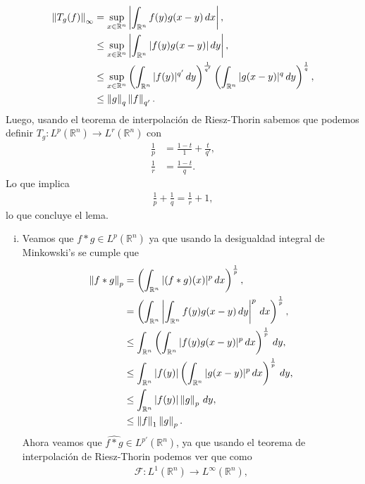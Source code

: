 \begin{homeworkProblem}
  \begin{align*}
    \left\|T_{g}(f)\right\|_{\infty}&=\sup_{x\in\mathbb{R}^{n}}\left| \int_{\mathbb{R}^{n}}f(y)g(x-y)\, dx \right|,\\
    &\leq \sup_{x\in\mathbb{R}^{n}}\left|\int_{\mathbb{R}^{n}}|f(y)g(x-y)|\, dy\right|,\\
    &\leq \sup_{x\in\mathbb{R}^{n}}\left( \int_{\mathbb{R}^{n}}|f(y)|^{q'}\, dy \right)^{\frac{1}{q'}}\left( \int_{\mathbb{R}^{n}}|g(x-y)|^{q}\, dy \right)^{\frac{1}{q}},\\
    &\leq \left\|g\right\|_{q}\left\|f\right\|_{q'}.
  \end{align*}
  Luego, usando el teorema de interpolación de Riesz-Thorin sabemos que podemos definir $T_g:L^{p}(\mathbb{R}^{n})\to L^{r}(\mathbb{R}^{n})$ con
  \begin{align*}
    \frac{1}{p}&=\frac{1-t}{1}+\frac{t}{q'},\\
    \frac{1}{r}&=\frac{1-t}{q}.
  \end{align*}
  Lo que implica
  \begin{align*}
    \frac{1}{p}+\frac{1}{q}=\frac{1}{r}+1,
  \end{align*}
  lo que concluye el lema.
  \begin{solution}
    \begin{enumerate}[(i)]
      \item Veamos que $f*g\in L^{p}(\mathbb{R}^{n})$ ya que usando la desigualdad integral de Minkowski's se cumple que
        \begin{align*}
          \left\|f*g\right\|_p&=\left(\int_{\mathbb{R}^{n}}|(f*g)(x)|^{p}\, dx\right)^{\frac{1}{p}},\\
          &=\left(\int_{\mathbb{R}^{n}}\left| \int_{\mathbb{R}^{n}}f(y)g(x-y)\, dy \right|^{p}\, dx\right)^{\frac{1}{p}},\\
          &\leq \int_{\mathbb{R}^{n}}\left(\int_{\mathbb{R}^{n}}|f(y)g(x-y)|^{p}\, dx\right)^{\frac{1}{p}}\, dy,\\
          &\leq \int_{\mathbb{R}^{n}}|f(y)|\left(\int_{\mathbb{R}^{n}}|g(x-y)|^{p}\, dx\right)^{\frac{1}{p}}\, dy,\\
          &\leq \int_{\mathbb{R}^{n}}|f(y)|\left\|g\right\|_{p}\, dy,\\
          &\leq \left\|f\right\|_{1}\left\|g\right\|_{p}.
        \end{align*}
        Ahora veamos que $\hat{f*g}\in L^{p'}(\mathbb{R}^{n})$, ya que usando el teorema de interpolación de Riesz-Thorin podemos ver que como
        \begin{align*}
          \mathcal{F}:L^{1}(\mathbb{R}^{n})\to L^{\infty}(\mathbb{R}^{n}),\\

\end{align*}
\end{enumerate}
\end{solution}
\end{homeworkProblem}
